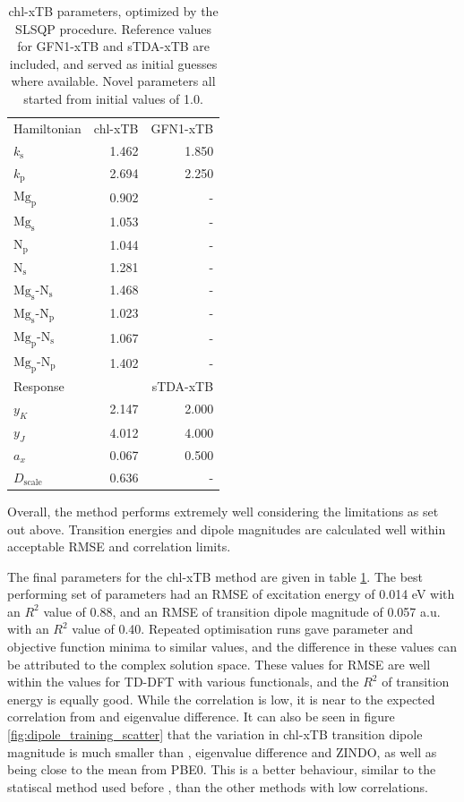 \begin{table}
    \centering
    \begin{tabular}{|| l r | r ||}
    \hline
    Hamiltonian & chl-xTB & GFN1-xTB \\
    $k_\text{s}$ & 1.462 & 1.850 \\
    $k_\text{p}$ & 2.694 & 2.250 \\

    $\text{Mg}_\text{p}$ & 0.902 & - \\
    $\text{Mg}_\text{s}$ & 1.053 & - \\
    $\text{N}_\text{p}$ & 1.044 & - \\
    $\text{N}_\text{s}$ & 1.281 & - \\

    $\text{Mg}_\text{s}$-$\text{N}_\text{s}$ & 1.468 & - \\
    $\text{Mg}_\text{s}$-$\text{N}_\text{p}$ & 1.023 & - \\
    $\text{Mg}_\text{p}$-$\text{N}_\text{s}$ & 1.067 & - \\
    $\text{Mg}_\text{p}$-$\text{N}_\text{p}$ & 1.402 & - \\

    \hline\hline
    Response & & sTDA-xTB\\
    $y_K$ & 2.147 & 2.000 \\
    $y_J$ & 4.012 & 4.000 \\
    $a_x$ & 0.067 & 0.500 \\
    $D_{\text{scale}}$ & 0.636 & - \\
    \hline
    \end{tabular}
    \caption{chl-xTB parameters, optimized by the SLSQP procedure. Reference values
    for GFN1-xTB and sTDA-xTB are included, and served as initial guesses where 
    available. Novel parameters all started from initial values of 1.0.}
    \label{table:chl_params}
\end{table}

Overall, the method performs extremely well considering the limitations as set out
above. Transition energies and dipole magnitudes are calculated well within acceptable
RMSE and correlation limits.

The final parameters for the chl-xTB method are given in table \ref{table:chl_params}.
The best performing set of parameters had an RMSE of excitation energy of 0.014 eV 
with an $R^2$ value of 0.88, and an RMSE of transition dipole magnitude of 0.057 a.u. 
with an $R^2$ value of 0.40. Repeated optimisation runs gave parameter and objective
function minima to similar values, and the difference in these values can be attributed
to the complex solution space. These values for RMSE are well within the values
for TD-DFT with various functionals, and the $R^2$ of transition energy is equally
good. While the correlation is low, it is near to the expected correlation from
\dscf and eigenvalue difference. It can also be seen in figure \ref{fig:dipole_training_scatter}
that the variation in chl-xTB transition dipole magnitude is much smaller than \dscf,
eigenvalue difference and ZINDO, as well as being close to the mean from PBE0. This
is a better behaviour, similar to the statiscal method used before \cite{Stross2016},
than the other methods with low correlations.

